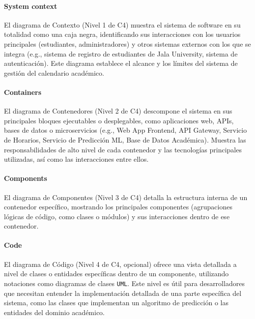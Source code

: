 \paragraph{System context}
El diagrama de Contexto (Nivel 1 de C4) muestra el sistema de software en su totalidad como una caja negra, identificando sus interacciones con los usuarios principales (estudiantes, administradores) y otros sistemas externos con los que se integra (e.g., sistema de registro de estudiantes de Jala University, sistema de autenticación).
Este diagrama establece el alcance y los límites del sistema de gestión del calendario académico.

\paragraph{Containers}
El diagrama de Contenedores (Nivel 2 de C4) descompone el sistema en sus principales bloques ejecutables o desplegables, como aplicaciones web, APIs, bases de datos o microservicios (e.g., Web App Frontend, API Gateway, Servicio de Horarios, Servicio de Predicción ML, Base de Datos Académica).
Muestra las responsabilidades de alto nivel de cada contenedor y las tecnologías principales utilizadas, así como las interacciones entre ellos.

\paragraph{Components}
El diagrama de Componentes (Nivel 3 de C4) detalla la estructura interna de un contenedor específico, mostrando los principales componentes (agrupaciones lógicas de código, como clases o módulos) y sus interacciones dentro de ese contenedor.

\paragraph{Code}
El diagrama de Código (Nivel 4 de C4, opcional) ofrece una vista detallada a nivel de clases o entidades específicas dentro de un componente, utilizando notaciones como diagramas de clases \texttt{UML}.
Este nivel es útil para desarrolladores que necesitan entender la implementación detallada de una parte específica del sistema, como las clases que implementan un algoritmo de predicción o las entidades del dominio académico.


